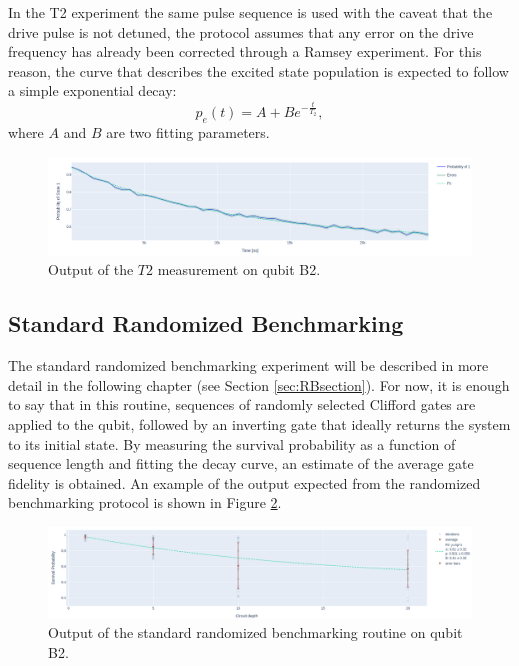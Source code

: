 In the T2 experiment the same pulse sequence is used with the caveat that the drive pulse is not detuned, the protocol assumes that any error on the drive frequency has already been corrected through a Ramsey experiment.
For this reason, the curve that describes the excited state population is expected to follow a simple exponential decay:
\begin{equation}
    p_e(t) = A + Be^{-\frac{t}{T_2}},
\end{equation}
where $A$ and $B$ are two fitting parameters.

\begin{figure}[h!]
    \centering
    \includegraphics[width=\textwidth]{figures/png/t2.png}
    \caption{Output of the $T2$ measurement on qubit B2.}
    \label{fig:t2}
\end{figure}

\subsection{Standard Randomized Benchmarking}\label{sec:RB_calibration}
The standard randomized benchmarking experiment will be described in more detail in the following chapter (see Section \ref{sec:RBsection}).
For now, it is enough to say that in this routine, sequences of randomly selected Clifford gates are applied to the qubit, followed by an inverting gate that ideally returns the system to its initial state. 
By measuring the survival probability as a function of sequence length and fitting the decay curve, an estimate of the average gate fidelity is obtained.
An example of the output expected from the randomized benchmarking protocol is shown in Figure \ref{fig:rb}.

\begin{figure}[h!]
    \centering
    \includegraphics[width=\textwidth]{figures/png/rb.png}
    \caption{Output of the standard randomized benchmarking routine on qubit B2.}
    \label{fig:rb}
\end{figure}


